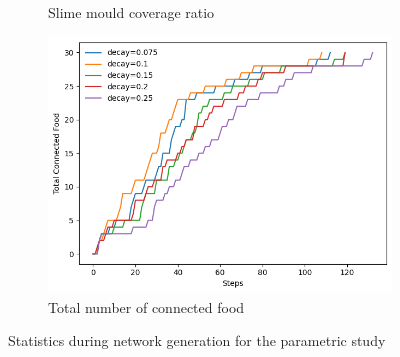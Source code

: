 \documentclass[11pt]{article}
\begin{document}
\begin{figure}[H]
\begin{subfigure}{0.32\textwidth}
        \caption{Slime mould coverage ratio}
    \end{subfigure}\hfill
    \begin{subfigure}{0.32\textwidth}
        \centering
        \includegraphics[width=\linewidth]{connectedf.png}
        \caption{Total number of connected food}
    \end{subfigure}
    \caption{Statistics during network generation for the parametric study}
\end{figure}
\end{document}
